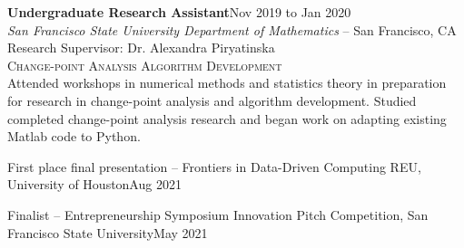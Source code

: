 \documentclass[hidelinks, 10pt]{article}
\begin{document}
{{    \begin{minipage}[ct]{0.9\linewidth}
        \textbf{Undergraduate Research Assistant}\hfill Nov 2019 to Jan 2020\\
        \emph{San Francisco State University Department of Mathematics} -- San Francisco, CA\\
        Research Supervisor: Dr. Alexandra Piryatinska\\
        {\textsc{Change-point Analysis Algorithm Development}}
        \vspace{1mm}\\
        Attended workshops in numerical methods and statistics theory in preparation for
        research in change-point analysis and algorithm development.  Studied completed
        change-point analysis research and began work on adapting existing Matlab code
        to Python.
    \end{minipage}

}

\vspace{7mm}


\hrulefill

\vspace{4mm}

\begin{minipage}[ct]{0.9\linewidth}
    First place final presentation -- Frontiers in Data-Driven Computing REU,
    University of Houston\hfill Aug 2021

    \vspace{1.5mm}

    Finalist -- Entrepreneurship Symposium Innovation Pitch Competition, San
    Francisco State University\hfill May 2021


\end{minipage}}
\end{document}

